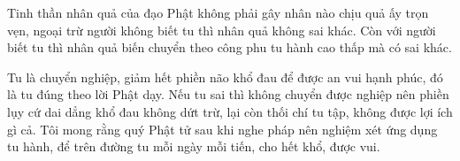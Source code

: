 \documentclass[
  12pt,
  oneside]{book}
\begin{document}
Tinh thần nhân quả của đạo Phật không phải gây nhân nào chịu quả ấy trọn vẹn, ngoại trừ người không biết tu thì nhân quả không sai khác. Còn với người biết tu thì nhân quả biến chuyển theo công phu tu hành cao thấp mà có sai khác.

Tu là chuyển nghiệp, giảm hết phiền não khổ đau để được an vui hạnh phúc, đó là tu đúng theo lời Phật dạy. Nếu tu sai thì không chuyển được nghiệp nên phiền lụy cứ dai dẳng khổ đau không dứt trừ, lại còn thối chí tu tập, không được lợi ích gì cả. Tôi mong rằng quý Phật tử sau khi nghe pháp nên nghiệm xét ứng dụng tu hành, để trên đường tu mỗi ngày mỗi tiến, cho hết khổ, được vui.
\end{document}
